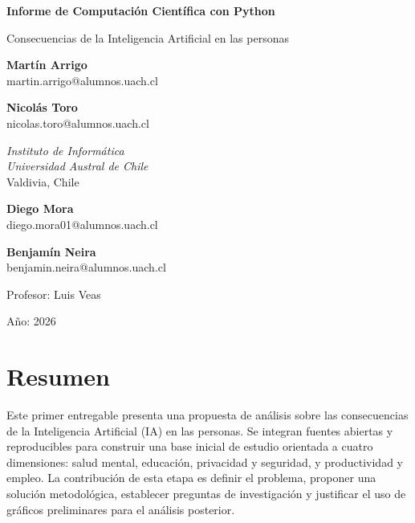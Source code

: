 \documentclass[12pt,a4paper]{article}
\begin{document}
\begin{center}
{\LARGE\bfseries Informe de Computación Científica con Python\par}
\vspace{0.15cm}
{\Large Consecuencias de la Inteligencia Artificial en las personas\par}
\vspace{0.35cm}

\begin{minipage}{0.47\textwidth}
\centering
\textbf{Martín Arrigo}\\
martin.arrigo@alumnos.uach.cl
\end{minipage}
\hfill
\begin{minipage}{0.47\textwidth}
\centering
\textbf{Nicolás Toro}\\
nicolas.toro@alumnos.uach.cl
\end{minipage}

\vspace{0.2cm}
\begin{center}
\textit{Instituto de Informática}\\
\textit{Universidad Austral de Chile}\\
Valdivia, Chile
\end{center}

\vspace{0.35cm}

\begin{minipage}{0.47\textwidth}
\centering
\textbf{Diego Mora}\\
diego.mora01@alumnos.uach.cl
\end{minipage}
\hfill
\begin{minipage}{0.47\textwidth}
\centering
\textbf{Benjamín Neira}\\
benjamin.neira@alumnos.uach.cl
\end{minipage}
\vspace{0.35cm}
 \vspace{0.4cm}
 {\large Profesor: Luis Veas\par}
 {\large Año: 2026\par}
\end{center}

\section*{Resumen}
Este primer entregable presenta una propuesta de análisis sobre las consecuencias de la Inteligencia Artificial (IA) en las personas. Se integran fuentes abiertas y reproducibles para construir una base inicial de estudio orientada a cuatro dimensiones: salud mental, educación, privacidad y seguridad, y productividad y empleo. La contribución de esta etapa es definir el problema, proponer una solución metodológica, establecer preguntas de investigación y justificar el uso de gráficos preliminares para el análisis posterior.
\end{document}
